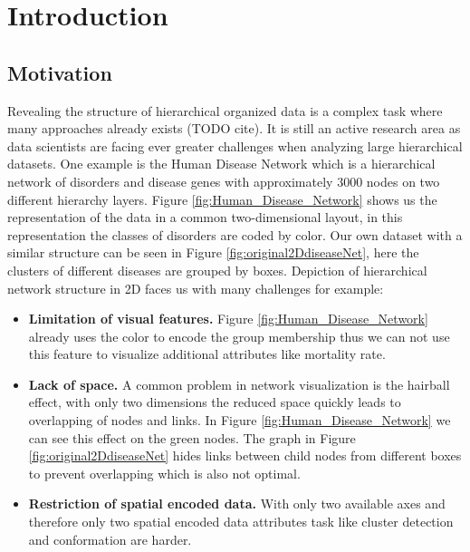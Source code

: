 \chapter{Introduction}

\section{Motivation}
Revealing the structure of hierarchical organized data is a complex task where many approaches already exists (TODO cite). It is still an active research area as data scientists are facing ever greater challenges when analyzing large hierarchical datasets. One example is the Human Disease Network \cite{zhou_human_2014} which is a hierarchical network of disorders and disease genes with approximately 3000 nodes on two different hierarchy layers. Figure \ref{fig:Human_Disease_Network} shows us the representation of the data in a common two-dimensional layout, in this representation the classes of disorders are coded by color. 
Our own dataset with a similar structure can be seen in Figure \ref{fig:original2DdiseaseNet}, here the clusters of different diseases are grouped by boxes. Depiction of hierarchical network structure in 2D faces us with many challenges for example: 
\begin{itemize}
    \item \textbf{Limitation of visual features.} Figure \ref{fig:Human_Disease_Network} already uses the color to encode the group membership thus we can not use this feature to visualize additional attributes like mortality rate.
    \item \textbf{Lack of space.} A common problem in network visualization is the hairball effect, with only two dimensions the reduced space quickly leads to overlapping of nodes and links. In Figure \ref{fig:Human_Disease_Network} we can see this effect on the green nodes. The graph in Figure \ref{fig:original2DdiseaseNet} hides links between child nodes from different boxes to prevent overlapping which is also not optimal.
    \item \textbf{Restriction of spatial encoded data.} With only two available axes and therefore only two spatial encoded data attributes task like cluster detection and conformation are harder.
\end{itemize} 

